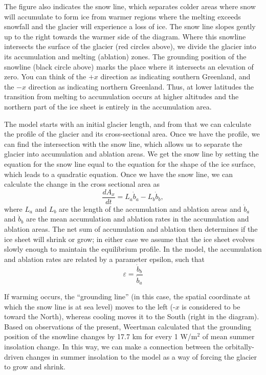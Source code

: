 \documentclass[11pt,letterpaper]{article}
\begin{document}
The figure also indicates the snow line, which separates colder areas where snow will accumulate to form ice from warmer regions where the melting exceeds snowfall and the glacier will experience a loss of ice. The snow line slopes gently up to the right towards the warmer side of the diagram. Where this snowline intersects the surface of the glacier (red circles above), we divide the glacier into its accumulation and melting (ablation) zones. The grounding position of the snowline (black circle above) marks the place where it intersects an elevation of zero. You can think of the $+x$ direction as indicating southern Greenland, and the $-x$ direction as indicating northern Greenland. Thus, at lower latitudes the transition from melting to accumulation occurs at higher altitudes and the northern part of the ice sheet is entirely in the accumulation area.

The model starts with an initial glacier length, and from that we can calculate the profile of the glacier and its cross-sectional area. Once we have the profile, we can find the intersection with the snow line, which allows us to separate the glacier into accumulation and ablation areas. We get the snow line by setting the equation for the snow line equal to the equation for the shape of the ice surface, which leads to a quadratic equation. Once we have the snow line, we can calculate the change in the cross sectional area as
\begin{equation}
\frac{dA_x}{dt}=L_{a}\dot b_{a}-L_{b}\dot b_{b},
\label{eq:dAdt}
\end{equation}
where $L_{a}$ and $L_{b}$ are the length of the accumulation and ablation areas and $\dot{b}_{a}$ and $\dot{b}_{b}$ are the mean accumulation and ablation rates in the accumulation and ablation areas. The net sum of accumulation and ablation then determines if the ice sheet will shrink or grow; in either case we assume that the ice sheet evolves slowly enough to maintain the equilibrium profile. In the model, the accumulation and ablation rates are related by a parameter epsilon, such that
\begin{equation}
\varepsilon=\frac{\dot{b}_{b}}{\dot{b}_{a}}
\end{equation}

If warming occurs, the ``grounding line'' (in this case, the spatial coordinate at which the snow line is at sea level) moves to the left ($‐x$ is considered to be toward the North), whereas cooling moves it to the South (right in the diagram). Based on observations of the present, Weertman calculated that the grounding position of the snowline changes by 17.7 km for every 1 W/m$^2$ of mean summer insolation change. In this way, we can make a connection between the orbitally-driven changes in summer insolation to the model as a way of forcing the glacier to grow and shrink.
\end{document}
